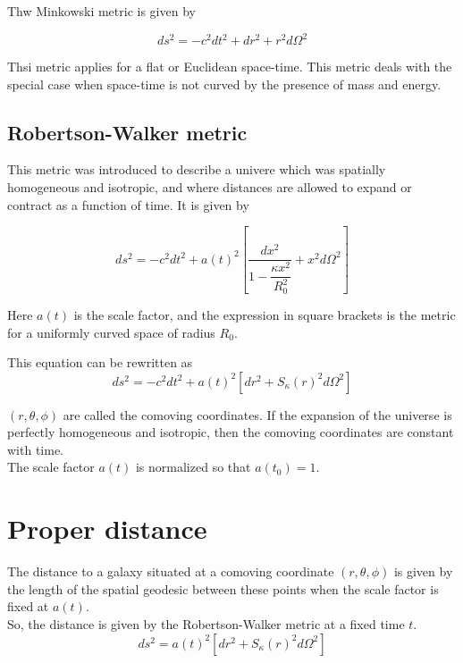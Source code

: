 \documentclass[a4,12pt,oneside]{report}
\begin{document}
	Thw Minkowski metric is given by
	
	\begin{equation}
		ds^2=-c^2dt^2+dr^2+r^2d\Omega^2
	\end{equation}
	
	Thsi metric applies for a flat or Euclidean space-time. This metric deals with the special case when space-time is not curved by the presence of mass and energy.
	
	\subsection{Robertson-Walker metric}
	
	This metric was introduced to describe a univere which was spatially homogeneous and isotropic, and where distances are allowed to expand or contract as a function of time. It is given by
	
	\begin{equation}
		ds^2=-c^2dt^2+a(t)^2\left[\frac{dx^2}{1-\dfrac{\kappa x^2}{R_0^2}} +x^2d\Omega^2\right]
	\end{equation}
	
	Here $a(t)$ is the scale factor, and the expression in square brackets is the metric for a uniformly curved space of radius $R_0$.

	This equation can be rewritten as 
	\begin{equation}
		ds^2=-c^2dt^2+a(t)^2[dr^2+S_\kappa(r)^2d\Omega^2]
	\end{equation}
	
	$ (r,\theta, \phi) $ are called the comoving coordinates. If the expansion of the universe is perfectly homogeneous and isotropic, then the comoving coordinates are constant with time. \\
	
	The scale factor $ a(t) $ is normalized so that $ a(t_0) =1$.
	
	\section{Proper distance}
	The distance to a galaxy situated at a comoving coordinate $ (r,\theta,\phi) $ is given by the length of the spatial geodesic between these points when the scale factor is fixed at $ a(t) $. \\
	
	So, the distance is given by the Robertson-Walker metric at a fixed time $ t $.
	\begin{equation}
		ds^2=a(t)^2[dr^2+S_\kappa(r)^2d\Omega^2]
	\end{equation}
	
\end{document}
